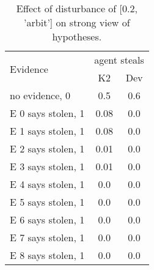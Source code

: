\begin{table}\begin{tabular}{l|cc}\toprule\multirow{2}{*}{Evidence} & \multicolumn{2}{c}{agent steals}\\& {K2} & {Dev}\\\midrule
no evidence, 0 & \cellcolor{Bittersweet}0.5&\cellcolor{Bittersweet}0.6\\E 0 says stolen, 1 & \cellcolor{Bittersweet}0.08&\cellcolor{Bittersweet}0.0\\E 1 says stolen, 1 & \cellcolor{Bittersweet}0.08&\cellcolor{Bittersweet}0.0\\E 2 says stolen, 1 & 0.01&0.0\\E 3 says stolen, 1 & 0.01&0.0\\E 4 says stolen, 1 & 0.0&0.0\\E 5 says stolen, 1 & 0.0&0.0\\E 6 says stolen, 1 & 0.0&0.0\\E 7 says stolen, 1 & 0.0&0.0\\E 8 says stolen, 1 & 0.0&0.0\\\bottomrule\end{tabular}\caption{Effect of disturbance of [0.2, 'arbit'] on strong view of hypotheses.}\end{table}